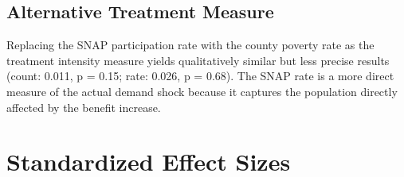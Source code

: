 \documentclass[12pt]{article}
\begin{document}
\subsection{Alternative Treatment Measure}

Replacing the SNAP participation rate with the county poverty rate as the treatment intensity measure yields qualitatively similar but less precise results (count: 0.011, p = 0.15; rate: 0.026, p = 0.68). The SNAP rate is a more direct measure of the actual demand shock because it captures the population directly affected by the benefit increase.

\section{Standardized Effect Sizes}
\label{sec:sde}


\end{document}
